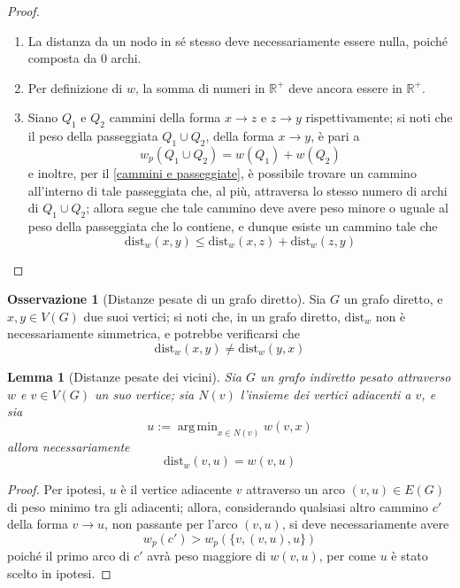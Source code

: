 \documentclass[14pt]{extreport}
\DeclareMathOperator*{\argmin}{arg\,min}
\newtheorem{lemma}{Lemma}[subsection]
\theoremstyle{definition}
\theoremstyle{definition}
\newtheorem{remark}{Osservazione}[subsection]
\begin{document}
\begin{proof}
    \hspace{0.7cm}
    \begin{enumerate}[\itshape i)]
        \item La distanza da un nodo in sé stesso deve necessariamente essere nulla, poiché composta da 0 archi.
        \item Per definizione di $w$, la somma di numeri in $\mathbb{R}^+$ deve ancora essere in $\mathbb{R}^+$.
        \item Siano $Q_1$ e $Q_2$ cammini della forma $x \rightarrow z$ e $z \rightarrow y$ rispettivamente; si noti che il peso della passeggiata $Q_1 \cup Q_2$, della forma $x \rightarrow y$, è pari a $$w_p(Q_1 \cup Q_2) = w(Q_1) + w(Q_2)$$ e inoltre, per il \cref{cammini e passeggiate}, è possibile trovare un cammino all'interno di tale passeggiata che, al più, attraversa lo stesso numero di archi di $Q_1 \cup Q_2$; allora segue che tale cammino deve avere peso minore o uguale al peso della passeggiata che lo contiene, e dunque esiste un cammino tale che $$\mathrm{dist}_w(x, y) \le \mathrm{dist}_w(x, z) + \mathrm{dist}_w(z, y)$$
    \end{enumerate}
\end{proof}

\begin{remark}[Distanze pesate di un grafo diretto]
    Sia $G$ un grafo diretto, e $x, y \in V(G)$ due suoi vertici; si noti che, in un grafo diretto, $\mathrm{dist}_w$ non è necessariamente simmetrica, e potrebbe verificarsi che $$\mathrm{dist}_w(x, y) \neq \mathrm{dist}_w(y, x)$$
\end{remark}

\begin{lemma}[Distanze pesate dei vicini]
    \label{vicini pesati}
    Sia $G$ un grafo indiretto pesato attraverso $w$ e $v \in V(G)$ un suo vertice; sia $N(v)$ l'insieme dei vertici adiacenti a $v$, e sia $$u := \argmin_{x \in N(v)}{w(v, x)}$$ allora necessariamente $$\mathrm{dist}_w(v, u) = w(v, u)$$
\end{lemma}

\begin{proof}
    Per ipotesi, $u$ è il vertice adiacente $v$ attraverso un arco $(v, u) \in E(G)$ di peso minimo tra gli adiacenti; allora, considerando qualsiasi altro cammino $c'$ della forma $v \rightarrow u$, non passante per l'arco $(v, u)$, si deve necessariamente avere $$w_p(c') > w_p(\{v, (v, u), u\})$$ poiché il primo arco di $c'$ avrà peso maggiore di $w(v, u)$, per come $u$ è stato scelto in ipotesi.
\end{proof}
\end{document}
